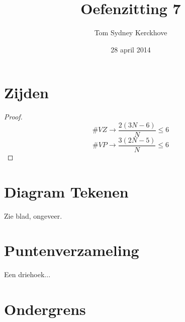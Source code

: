 \documentclass[10pt,a4paper]{article}
\title{Oefenzitting 7}
\author{Tom Sydney Kerckhove}
\date{28 april 2014}
\begin{document}
\maketitle


\section{Zijden}
\begin{proof}
\[
\#VZ \rightarrow \frac{2(3N-6)}{N} \le 6
\]
\[
\#VP \rightarrow \frac{3(2N-5)}{N} \le 6 
\]
\end{proof}

\section{Diagram Tekenen}
Zie blad, ongeveer.

\section{Puntenverzameling}
Een driehoek...

\section{Ondergrens}



\end{document}
